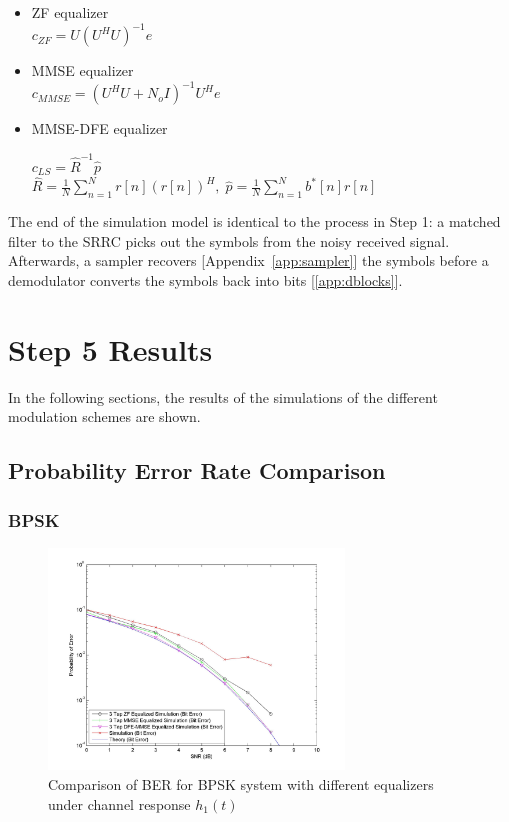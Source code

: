 \documentclass[]{article}
\begin{document}
\begin{itemize}
\item ZF equalizer \\

$c_{ZF} = U(U^HU)^{-1}e$ \\

\item MMSE equalizer \\

$c_{MMSE} = (U^HU + N_oI)^{-1}U^He$ \\

\item MMSE-DFE equalizer

$c_{LS} = \hat{R}^{-1}\hat{p} $ \\

$ \hat{R} = \frac{1}{N} \sum_{n=1}^N r[n](r[n])^H, \; \hat{p} = \frac{1}{N}\sum_{n=1}^N b^*[n]r[n]$ \\


\end{itemize}


The end of the simulation model is identical to the process in Step 1: a matched filter to the SRRC picks out the symbols from the noisy received signal.  Afterwards, a sampler recovers [Appendix~\ref{app:sampler}] the symbols before a demodulator converts the symbols back into bits [\ref{app:dblocks}].  



\section{Step 5 Results}
\label{sec:results}
In the following sections, the results of the simulations of the different modulation schemes are shown. 

\subsection{Probability Error Rate Comparison}
\label{sec:compare}

\subsubsection{BPSK}

\begin{figure}[H]
\centering
\includegraphics[width=0.7\textwidth]{bpSNR1.jpg}
\caption{Comparison of BER for BPSK system with different equalizers under channel response $h_1(t)$}
\end{figure}
\end{document}
